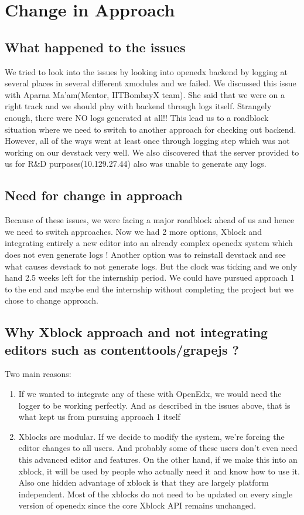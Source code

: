 \section{Change in Approach}
\subsection{What happened to the issues}
We tried to look into the issues by looking into openedx backend by logging at several places in
several different xmodules and we failed. We discussed this issue with Aparna Ma’am(Mentor,
IITBombayX team). She said that we were on a right track and we should play with backend
through logs itself. Strangely enough, there were NO logs generated at all!! This lead us to a
roadblock situation where we need to switch to another approach for checking out backend.
However, all of the ways went at least once through logging step which was not working on our
devstack very well. We also discovered that the server provided to us for R\&D
purposes(10.129.27.44) also was unable to generate any logs.
\subsection{Need for change in approach}
Because of these issues, we were facing a major roadblock ahead of us and hence we need to
switch approaches. Now we had 2 more options, Xblock and integrating entirely a new editor into
an already complex openedx system which does not even generate logs ! Another option was to
reinstall devstack and see what causes devstack to not generate logs. But the clock was ticking and
we only hand 2.5 weeks left for the internship period. We could have pursued approach 1 to the end
and maybe end the internship without completing the project but we chose to change approach.
\subsection{Why Xblock approach and not integrating editors such as
contenttools/grapejs ?}
Two main reasons:
\begin{enumerate}
\item If we wanted to integrate any of these with OpenEdx, we would need the logger to be working
perfectly. And as described in the issues above, that is what kept us from pursuing approach 1 itself
\item Xblocks are modular. If we decide to modify the system, we’re forcing the editor changes to all
users. And probably some of these users don’t even need this advanced editor and features. On the
other hand, if we make this into an xblock, it will be used by people who actually need it and know
how to use it. Also one hidden advantage of xblock is that they are largely platform independent.
Most of the xblocks do not need to be updated on every single version of openedx since the core
Xblock API remains unchanged.
\end{enumerate}


